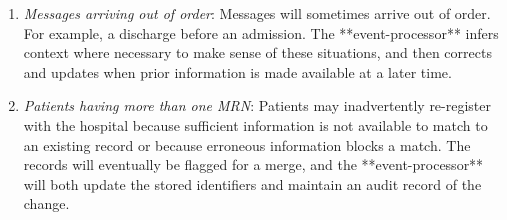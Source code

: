 \documentclass[pmlr,twocolumn,10pt]{jmlr} %
\begin{document}
\begin{enumerate}
\begin{enumerate}
        \item \textit{Messages arriving out of order}: Messages will sometimes arrive out of order. For example, a discharge before an admission. The **event-processor** infers context where necessary to make sense of these situations, and then corrects and updates when prior information is made available at a later time.
        \item \textit{Patients having more than one MRN}: Patients may inadvertently re-register with the hospital because sufficient information is not available to match to an existing record or because erroneous information blocks a match. The records will eventually be flagged for a merge, and the **event-processor** will both update the stored identifiers and maintain an audit record of the change.
    \end{enumerate}
\end{enumerate}
\end{document}
